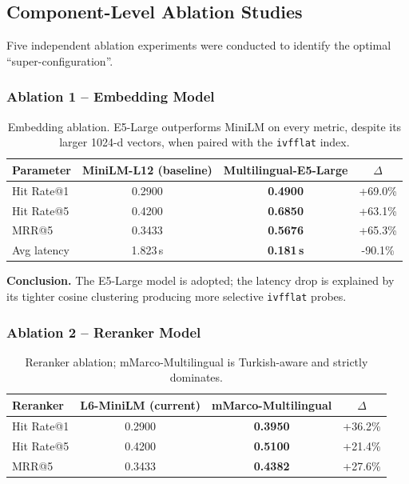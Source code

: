 \documentclass[11pt, a4paper]{article}
\begin{document}
\subsection{Component-Level Ablation Studies}

Five independent ablation experiments were conducted to identify the optimal ``super-configuration''.

\subsubsection{Ablation 1 -- Embedding Model}

\begin{table}[H]
    \centering
    \small
    \begin{tabular}{lccc}
        \toprule
        \textbf{Parameter} & \textbf{MiniLM-L12 (baseline)} & \textbf{Multilingual-E5-Large} & \textbf{$\Delta$}\\
        \midrule
        Hit Rate@1 & 0.2900 & \textbf{0.4900} & +69.0\% \\
        Hit Rate@5 & 0.4200 & \textbf{0.6850} & +63.1\% \\
        MRR@5      & 0.3433 & \textbf{0.5676} & +65.3\% \\
        Avg latency & 1.823\,s & \textbf{0.181\,s} & -90.1\% \\
        \bottomrule
    \end{tabular}
    \caption{Embedding ablation. E5-Large outperforms MiniLM on every metric, despite its larger 1024-d vectors, when paired with the \texttt{ivfflat} index.}
\end{table}

\textbf{Conclusion.} The E5-Large model is adopted; the latency drop is explained by its tighter cosine clustering producing more selective \texttt{ivfflat} probes.

\subsubsection{Ablation 2 -- Reranker Model}

\begin{table}[H]
    \centering
    \small
    \begin{tabular}{lccc}
        \toprule
        \textbf{Reranker} & \textbf{L6-MiniLM (current)} & \textbf{mMarco-Multilingual} & \textbf{$\Delta$}\\
        \midrule
        Hit Rate@1 & 0.2900 & \textbf{0.3950} & +36.2\%\\
        Hit Rate@5 & 0.4200 & \textbf{0.5100} & +21.4\%\\
        MRR@5      & 0.3433 & \textbf{0.4382} & +27.6\%\\
        \bottomrule
    \end{tabular}
    \caption{Reranker ablation; mMarco-Multilingual is Turkish-aware and strictly dominates.}
\end{table}
\end{document}
